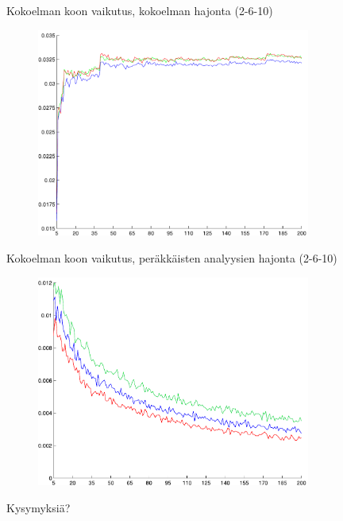\documentclass{beamer}
\begin{document}
\begin{frame}{Kokoelman koon vaikutus, kokoelman hajonta (2-6-10)}

\begin{figure}
\includegraphics[width=9cm]{ensemble_stdev.pdf}
\end{figure}

\end{frame}

\begin{frame}{Kokoelman koon vaikutus, peräkkäisten analyysien hajonta (2-6-10)}

\begin{figure}
\includegraphics[width=9cm]{stdev_between_analysis.pdf}
\end{figure}

\end{frame}

\begin{frame}{Kysymyksiä?}


\end{frame}
\end{document}
